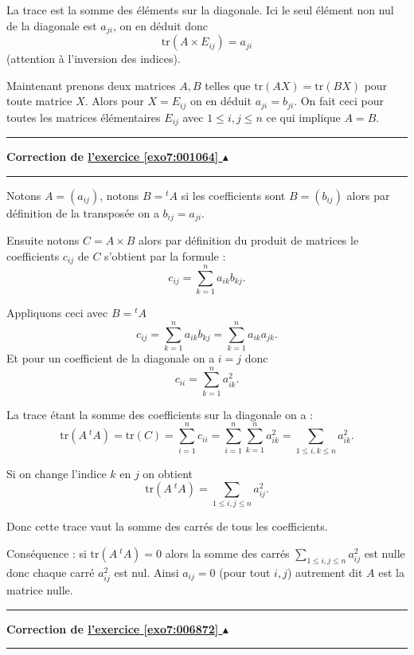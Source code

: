 \documentclass[11pt,a4paper]{article}
\renewcommand{\le}{\leqslant} \renewcommand{\leq}{\leqslant}
\newcounter{exo}
\newcommand{\correction}[1]{\hypertarget{cor7:#1}{}\label{cor7:#1}{\bf Correction de \hyperlink{exo7:#1}{l'exercice \ref{exo7:#1} $\blacktriangle$}}\vspace{1mm}\hrule\vspace{1mm}}
\newcommand{\fincorrection}{\vspace{1mm}\hrule\vspace*{7mm}}
\begin{document}
La trace est la somme des éléments sur la diagonale. Ici le seul élément non nul de la diagonale est
$a_{ji}$, on en déduit donc 
$$\text{tr} (A \times E_{ij})=a_{ji}$$
(attention à l'inversion des indices).

Maintenant prenons deux matrices $A, B$ telles que $\text{tr} (AX) = \text{tr} (BX)$
pour toute matrice $X$. Alors pour $X=E_{ij}$ on en déduit $a_{ji}=b_{ji}$.
On fait ceci pour toutes les matrices élémentaires $E_{ij}$ avec $1 \le i,j \le n$
ce qui implique $A=B$.
\fincorrection
\correction{001064}
Notons $A=(a_{ij})$, notons $B = {}^{t}\!{A}$ si les coefficients sont $B=(b_{ij})$ 
alors par définition de la transposée on a $b_{ij}= a_{ji}$.

Ensuite notons $C = A \times B$ alors par définition du produit de matrices 
le coefficients $c_{ij}$ de $C$ s'obtient par la formule :
$$c_{ij} = \sum_{k=1}^n a_{ik}b_{kj}.$$

Appliquons ceci avec $B = {}^{t}\!{A}$
$$c_{ij} = \sum_{k=1}^n a_{ik}b_{kj} = \sum_{k=1}^n a_{ik}a_{jk}.$$
Et pour un coefficient de la diagonale on a $i=j$ donc 
$$c_{ii} =  \sum_{k=1}^n a_{ik}^2.$$

La trace étant la somme des coefficients sur la diagonale on a :
$$\text{tr} (A \ {}^{t}\!{A}) = \text{tr} (C) 
= \sum_{i=1}^n c_{ii} =  \sum_{i=1}^n \sum_{k=1}^n a_{ik}^2 = \sum_{1\le i,k \le n} a_{ik}^2.$$

Si on change l'indice $k$ en $j$ on obtient 
$$\text{tr} (A \ {}^{t}\!{A})  = \sum_{1\le i,j \le n} a_{ij}^2.$$

Donc cette trace vaut la somme des carrés de tous les coefficients.

Conséquence : si $\text{tr} (A \ {}^{t}\!{A}) = 0$ alors la somme des carrés 
$\sum_{1\le i,j \le n} a_{ij}^2$ est nulle 
donc chaque carré $a_{ij}^2$ est nul. Ainsi $a_{ij}=0$ (pour tout $i,j$) autrement dit $A$ est la matrice nulle.
\fincorrection
\correction{006872}
\end{document}
